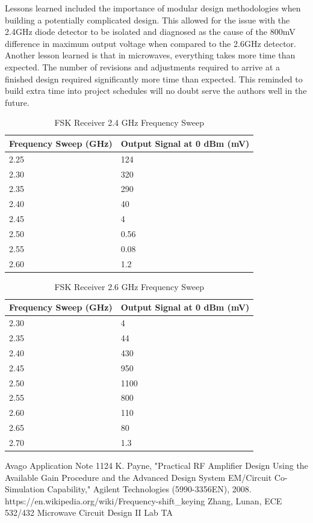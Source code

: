\documentclass[conference]{IEEEtran}
\begin{document}
Lessons learned included the importance of modular design methodologies when building a potentially complicated design. This allowed for the issue with the 2.4GHz diode detector to be isolated and diagnosed as the cause of the 800mV difference in maximum output voltage when compared to the 2.6GHz detector. Another lesson learned is that in microwaves, everything takes more time than expected. The number of revisions and adjustments required to arrive at a finished design required significantly more time than expected. This reminded to build extra time into project schedules will no doubt serve the authors well in the future.
\begin{table}
\caption{FSK Receiver 2.4 GHz Frequency Sweep}
\begin{tabular}{|l|l|}
\hline
Frequency Sweep (GHz) & Output Signal at 0 dBm (mV) \\\hline
2.25 & 124 \\\hline
2.30 & 320 \\\hline
2.35 & 290 \\\hline
2.40 & 40 \\\hline
2.45 & 4 \\\hline
2.50 & 0.56 \\\hline
2.55 & 0.08 \\\hline
2.60 & 1.2 \\\hline
\end{tabular}
\label{tab:fsk24}
\end{table}
 
\begin{table}
\caption{FSK Receiver 2.6 GHz Frequency Sweep}
\begin{tabular}{|l|l|}
\hline
Frequency Sweep (GHz) & Output Signal at 0 dBm (mV) \\ \hline
2.30 & 4 \\ \hline
2.35 & 44 \\ \hline
2.40 & 430 \\ \hline
2.45 & 950 \\ \hline
2.50 & 1100 \\ \hline
2.55 & 800 \\\hline
2.60 & 110 \\ \hline
2.65 & 80 \\\hline
2.70 & 1.3 \\\hline
\end{tabular}
\label{tab:fsk26}
\end{table}

\begin{thebibliography}{1}
Avago Application Note 1124
K. Payne, "Practical RF Amplifier Design Using the Available Gain Procedure and the Advanced Design System EM/Circuit Co-Simulation Capability," Agilent Technologies (5990-3356EN), 2008.
https://en.wikipedia.org/wiki/Frequency-shift\_keying
Zhang, Lunan, ECE 532/432 Microwave Circuit Design II Lab TA
\end{thebibliography}
\end{document}
